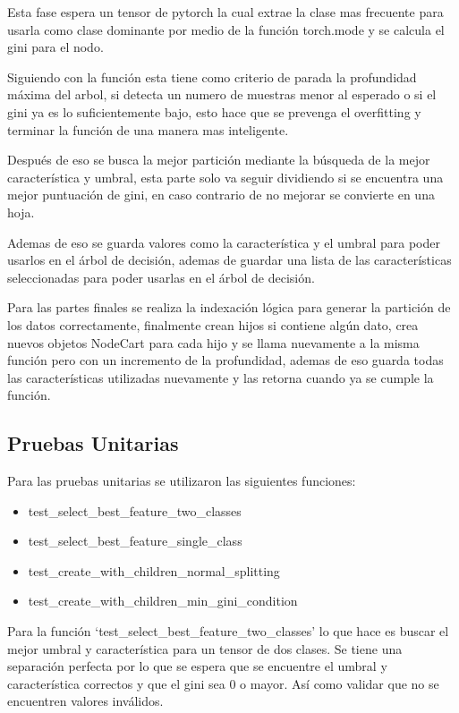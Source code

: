 \documentclass[12pt,a4paper]{article}
\begin{document}
Esta fase espera un tensor de pytorch la cual extrae la clase mas frecuente para usarla
como clase dominante por medio de la función torch.mode
y se calcula el gini para el nodo.

Siguiendo con la función esta tiene como criterio de parada la profundidad máxima del arbol, si detecta un numero de muestras
menor al esperado o si el gini ya es lo suficientemente bajo, esto hace que se prevenga el overfitting y terminar
la función de una manera mas inteligente.

Después de eso se busca la mejor partición mediante la búsqueda de la mejor característica y umbral, esta parte solo
va seguir dividiendo si se encuentra una mejor puntuación de gini, en caso contrario de no mejorar
se convierte en una hoja.

Ademas de eso se guarda valores como la característica y el umbral para poder usarlos en el árbol de decisión, ademas de
guardar una lista de las características seleccionadas para poder usarlas en el árbol de decisión.

Para las partes finales se realiza la indexación lógica para generar la partición de los datos correctamente, finalmente
crean hijos si contiene algún dato, crea nuevos objetos NodeCart para cada hijo y se llama nuevamente a la misma función
pero con un incremento de la profundidad, ademas de eso guarda todas las características utilizadas nuevamente
y las retorna cuando ya se cumple la función.

\subsection{Pruebas Unitarias}\label{subsec:pruebas-unitarias}

Para las pruebas unitarias se utilizaron las siguientes funciones:

\begin{itemize}
  \item test_select_best_feature_two_classes
  \item test_select_best_feature_single_class
  \item test_create_with_children_normal_splitting
  \item test_create_with_children_min_gini_condition
\end{itemize}

Para la función `test_select_best_feature_two_classes' lo que hace es buscar el mejor umbral
y característica para un tensor de dos clases. Se tiene una separación perfecta por lo que
se espera que se encuentre el umbral y característica correctos y que el gini sea 0 o mayor.
Así como validar que no se encuentren valores inválidos.
\end{document}
